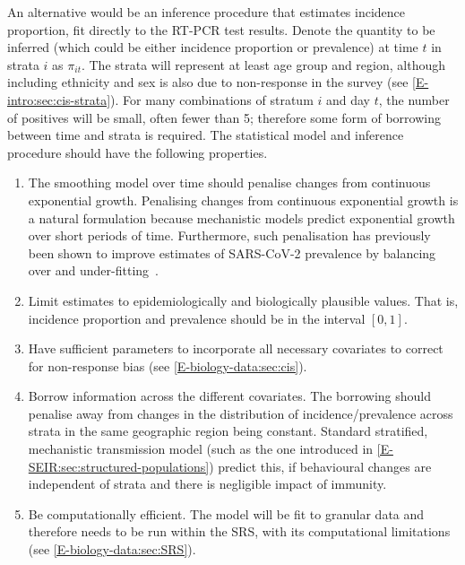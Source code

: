\documentclass[thesis.tex]{subfiles}
\begin{document}
An alternative would be an inference procedure that estimates incidence proportion, fit directly to the RT-PCR test results.
Denote the quantity to be inferred (which could be either incidence proportion or prevalence) at time $t$ in strata $i$ as $\pi_{it}$.
The strata will represent at least age group and region, although including ethnicity and sex is also due to non-response in the survey (see \cref{E-intro:sec:cis-strata}).
For many combinations of stratum $i$ and day $t$, the number of positives will be small, often fewer than 5; therefore some form of borrowing between time and strata is required.
The statistical model and inference procedure should have the following properties.
\begin{enumerate}
    \item The smoothing model over time should penalise changes from continuous exponential growth.
        Penalising changes from continuous exponential growth is a natural formulation because mechanistic models predict exponential growth over short periods of time.
        Furthermore, such penalisation has previously been shown to improve estimates of SARS-CoV-2 prevalence by balancing over and under-fitting~\autocite{ealesAppropriately}.
    \item Limit estimates to epidemiologically and biologically plausible values.
        That is, incidence proportion and prevalence should be in the interval $[0, 1]$.
    \item Have sufficient parameters to incorporate all necessary covariates to correct for non-response bias (see \cref{E-biology-data:sec:cis}).
    \item Borrow information across the different covariates.
        The borrowing should penalise away from changes in the distribution of incidence/prevalence across strata in the same geographic region being constant.
        Standard stratified, mechanistic transmission model (such as the one introduced in \cref{E-SEIR:sec:structured-populations}) predict this, if behavioural changes are independent of strata and there is negligible impact of immunity.
    \item Be computationally efficient.
        The model will be fit to granular data and therefore needs to be run within the SRS, with its computational limitations (see \cref{E-biology-data:sec:SRS}).
\end{enumerate}
\end{document}
